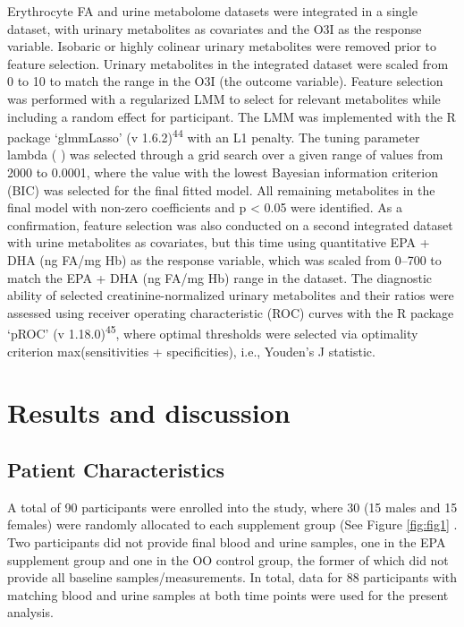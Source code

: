 \documentclass[journal=jacsat,manuscript=article]{achemso}
\begin{document}
Erythrocyte FA and urine metabolome datasets were integrated in a single
dataset, with urinary metabolites as covariates and the O3I as the
response variable. Isobaric or highly colinear urinary metabolites were
removed prior to feature selection. Urinary metabolites in the
integrated dataset were scaled from 0 to 10 to match the range in the
O3I (the outcome variable). Feature selection was performed with a
regularized LMM to select for relevant metabolites while including a
random effect for participant. The LMM was implemented with the R
package `glmmLasso' (v 1.6.2)\textsuperscript{44} with an L1 penalty.
The tuning parameter lambda ( ) was selected through a grid search over
a given range of values from 2000 to 0.0001, where the value with the
lowest Bayesian information criterion (BIC) was selected for the final
fitted model. All remaining metabolites in the final model with non-zero
coefficients and p \textless{} 0.05 were identified. As a confirmation,
feature selection was also conducted on a second integrated dataset with
urine metabolites as covariates, but this time using quantitative EPA +
DHA (ng FA/mg Hb) as the response variable, which was scaled from 0--700
to match the EPA + DHA (ng FA/mg Hb) range in the dataset. The
diagnostic ability of selected creatinine-normalized urinary metabolites
and their ratios were assessed using receiver operating characteristic
(ROC) curves with the R package `pROC' (v 1.18.0)\textsuperscript{45},
where optimal thresholds were selected via optimality criterion
max(sensitivities + specificities), i.e., Youden's J statistic.

\section{Results and discussion}\label{results-and-discussion}

\subsection{Patient Characteristics}\label{patient-characteristics}

A total of 90 participants were enrolled into the study, where 30 (15
males and 15 females) were randomly allocated to each supplement group
(See Figure \ref{fig:fig1} . Two participants did not provide final
blood and urine samples, one in the EPA supplement group and one in the
OO control group, the former of which did not provide all baseline
samples/measurements. In total, data for 88 participants with matching
blood and urine samples at both time points were used for the present
analysis.
\end{document}
